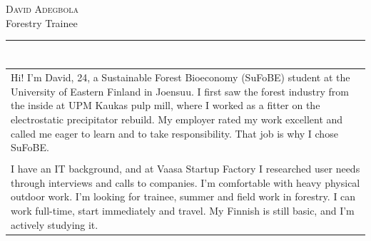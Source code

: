 \documentclass[a4paper,11pt]{article}
\begin{document}
\small
\setlength{\cvlabelw}{3.9cm}
\titlespacing{\section}{0pt}{0.55em}{2pt}

\begin{cvheader}
\par{\centering
		{\Huge \textsc{David Adegbola}}\\[0.4em]
		{\Large Forestry Trainee}
	\bigskip\par}

\hrule
\vspace{0.5em}
\end{cvheader}

\section{}
\begin{tabular}{p{}}
 Hi! I'm David, 24, a Sustainable Forest Bioeconomy (SuFoBE) student at the University of Eastern Finland in Joensuu. I first saw the forest industry from the inside at UPM Kaukas pulp mill, where I worked as a fitter on the electrostatic precipitator rebuild. My employer rated my work excellent and called me eager to learn and to take responsibility. That job is why I chose SuFoBE.\\\\

 I have an IT background, and at Vaasa Startup Factory I researched user needs through interviews and calls to companies. I'm comfortable with heavy physical outdoor work. I'm looking for trainee, summer and field work in forestry. I can work full-time, start immediately and travel. My Finnish is still basic, and I'm actively studying it.
\end{tabular}

\section{}
\end{document}
